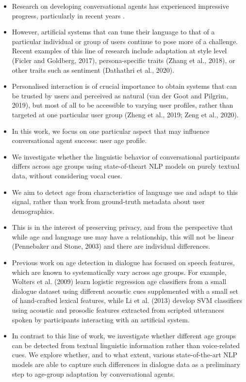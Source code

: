 \begin{itemize}
    \item Research on developing conversational agents has experienced impressive progress, particularly in recent years \citep{mctear2020conversational}. 
    \item However, artificial systems that can tune their language to that of a particular individual or group of users continue to pose more of a challenge. Recent examples of this line of research include adaptation at style level (Ficler and Goldberg, 2017), persona-specific traits (Zhang et al., 2018), or other traits such as sentiment (Dathathri et al., 2020).
    \item Personalised interaction is of crucial importance to obtain systems that can be trusted by users and perceived as natural (van der Goot and Pilgrim, 2019), but most of all to be accessible to varying user profiles, rather than targeted at one particular user group (Zheng et al., 2019; Zeng et al., 2020).
    \item  In this work, we focus on one particular aspect that may influence conversational agent success: user age profile.
    \item We investigate whether the linguistic behavior of conversational participants differs across age  groups using state-of-theart NLP models on purely textual data, without considering vocal cues. 
    \item We aim to detect age from characteristics of language use and adapt to this signal, rather than work from ground-truth metadata about user demographics. 
    \item {} This is in the interest of preserving privacy, and from the perspective that while age and language use may have a relationship, this will not be linear (Pennebaker and Stone, 2003) and there are individual differences. 
    \item Previous work on age detection in dialogue has
    focused on speech features, which are known to systematically vary across age groups. For example, Wolters et al. (2009) learn logistic regression age classifiers from a small dialogue dataset using different acoustic cues supplemented with a small set of hand-crafted lexical features, while Li et al. (2013) develop SVM classifiers using acoustic and prosodic features extracted from scripted utterances spoken by participants interacting with an artificial system.
    \item In contrast to this line of work, we investigate whether different age groups can be detected from textual linguistic information rather than voice-related cues. We explore whether, and to what extent, various state-of-the-art NLP models are able to capture such differences in dialogue data as a preliminary step to age-group adaptation by conversational agents. 

\end{itemize}
